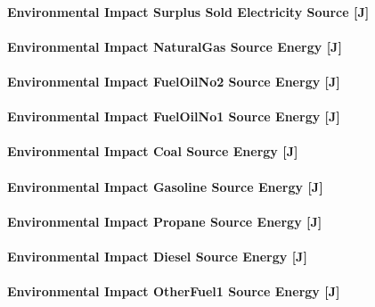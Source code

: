 \paragraph{Environmental Impact Surplus Sold Electricity Source {[}J{]}}\label{environmental-impact-surplus-sold-electricity-source-j}

\paragraph{Environmental Impact NaturalGas Source Energy {[}J{]}}\label{environmental-impact-natural-gas-source-energy-j}

\paragraph{Environmental Impact FuelOilNo2 Source Energy {[}J{]}}\label{environmental-impact-fuel-oil-2-source-energy-j}

\paragraph{Environmental Impact FuelOilNo1 Source Energy {[}J{]}}\label{environmental-impact-fuel-oil-1-source-energy-j}

\paragraph{Environmental Impact Coal Source Energy {[}J{]}}\label{environmental-impact-coal-source-energy-j}

\paragraph{Environmental Impact Gasoline Source Energy {[}J{]}}\label{environmental-impact-gasoline-source-energy-j}

\paragraph{Environmental Impact Propane Source Energy {[}J{]}}\label{environmental-impact-propane-source-energy-j}

\paragraph{Environmental Impact Diesel Source Energy {[}J{]}}\label{environmental-impact-diesel-source-energy-j}

\paragraph{Environmental Impact OtherFuel1 Source Energy {[}J{]}}\label{environmental-impact-otherfuel1-source-energy-j}

